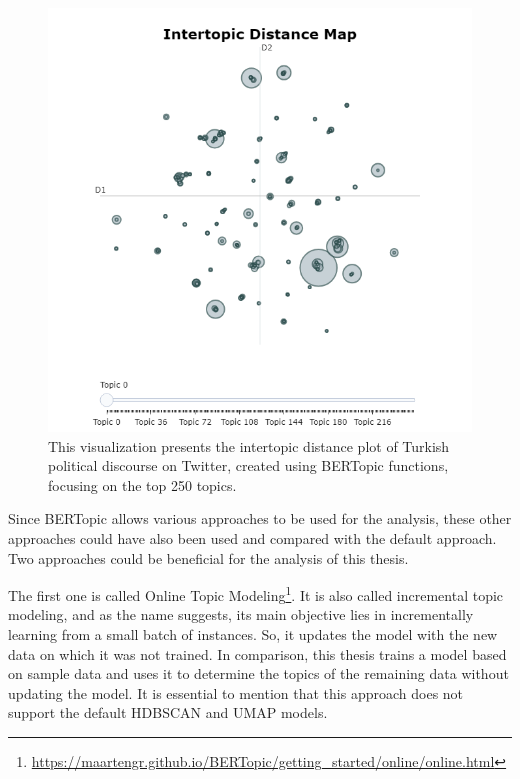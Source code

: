 
\begin{figure}[h!]
    \centering
    \includegraphics[width=0.75\linewidth]{figures/intertopic_distance_plot.png}
    \caption[BERTopic's Intertopic Distance Plot]
    {This visualization presents the intertopic distance plot of Turkish political discourse on Twitter, 
    created using BERTopic functions, focusing on the top 250 topics.}\label{fig:intertopic_distance_plot}
\end{figure}

Since BERTopic allows various approaches to be used for the analysis, these other approaches could 
have also been used and compared with the default approach. Two approaches could be beneficial for 
the analysis of this thesis. 

The first one is called Online Topic 
Modeling\footnote{\url{https://maartengr.github.io/BERTopic/getting_started/online/online.html}}. It 
is also called incremental topic modeling, and as the name suggests, its main objective lies in 
incrementally learning from a small batch of instances. So, it updates the model with the new data 
on which it was not trained. In comparison, this thesis trains a model based on sample data and 
uses it to determine the topics of the remaining data without updating the model. It is essential 
to mention that this approach does not support the default HDBSCAN and UMAP models.
 
